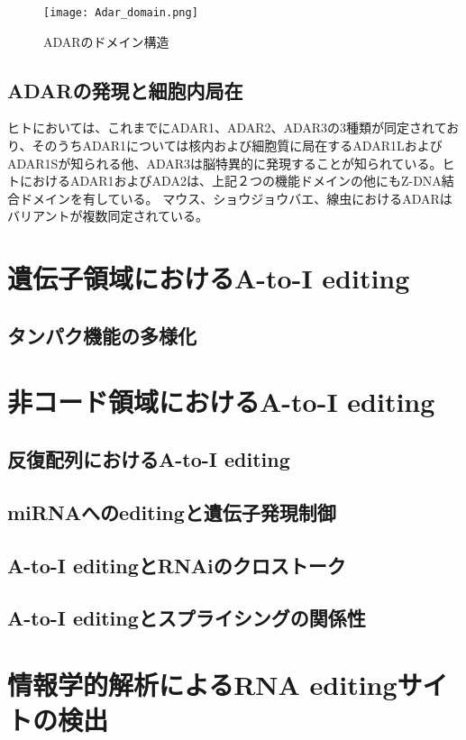 \begin{figure}[htbp]
	\begin{center}
		\texttt{[image: Adar\_domain.png]}
	\end{center}
	\caption{ADARのドメイン構造}
\end{figure}

\subsection{ADARの発現と細胞内局在}
ヒトにおいては、これまでにADAR1、ADAR2、ADAR3の3種類が同定されており、そのうちADAR1については核内および細胞質に局在するADAR1LおよびADAR1Sが知られる他、ADAR3は脳特異的に発現することが知られている。ヒトにおけるADAR1およびADA2は、上記２つの機能ドメインの他にもZ-DNA結合ドメインを有している。
マウス、ショウジョウバエ、線虫におけるADARはバリアントが複数同定されている。

\section{遺伝子領域におけるA-to-I editing}
\subsection{タンパク機能の多様化}

\section{非コード領域におけるA-to-I editing}
\subsection{反復配列におけるA-to-I editing}

\subsection{miRNAへのeditingと遺伝子発現制御}
\subsection{A-to-I editingとRNAiのクロストーク}
\subsection{A-to-I editingとスプライシングの関係性}

\section{情報学的解析によるRNA editingサイトの検出}
